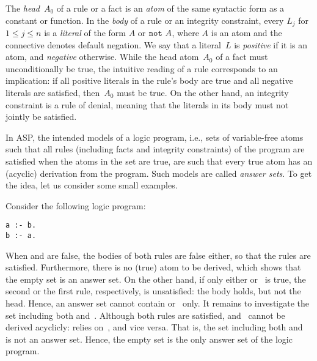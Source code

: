 \noindent
The \emph{head}~$A_0$ of a rule or a fact is an \emph{atom} of the same 
syntactic form as a constant or function.
%
In the \emph{body} of a rule or an integrity constraint,
every $L_j$ for $1\leq j\leq n$ is a \emph{literal} of the form $A$ or $\texttt{not}~A$,
where $A$ is an atom and
the connective  denotes default negation.
%
%
We say that a literal~$L$ is \emph{positive} if it is an atom,
and \emph{negative} otherwise.
While the head atom~$A_0$ of a fact must unconditionally be true,
the intuitive reading of a rule corresponds to an implication:
if all positive literals in the rule's body are true and all negative
literals are satisfied, then~$A_0$ must be true.
On the other hand, an integrity constraint is a rule of denial,
meaning that the literals in its body must not jointly be satisfied.

In ASP, the intended models of a logic program, i.e.,
sets of variable-free atoms such that all rules
(including facts and integrity constraints)
of the program are satisfied when the atoms in the set are true, 
are such that every true atom has an (acyclic) derivation from the program.
Such models are called \emph{answer sets}.
To get the idea, let us consider some small examples.

\begin{example}\label{ex:as:one}
Consider the following logic program:
%
\begin{lstlisting}[numbers=none]
a :- b.
b :- a.
\end{lstlisting}
%
When  and  are false, the bodies of both rules are false either,
so that the rules are satisfied.
Furthermore, there is no (true) atom to be derived,
which shows that the empty set is an answer set. 
On the other hand, if only either  or~ is true,
the second or the first rule, respectively, is unsatisfied:
the body holds, but not the head.
Hence, an answer set cannot contain  or~ only.
It remains to investigate the set including both  and~.
Although both rules are satisfied, %
 and~ cannot be derived acyclicly:
 relies on~, and vice versa.
That is, the set including both  and~ is not an answer set. %
Hence, the empty set is the only answer set of the logic program.
\eexample
\end{example}

